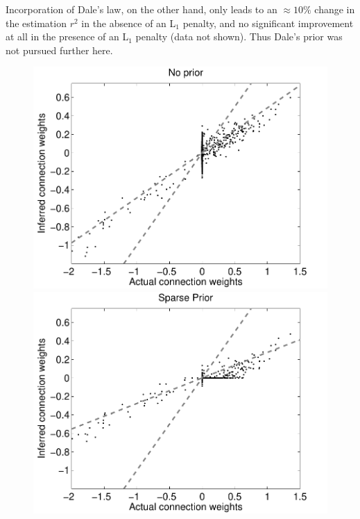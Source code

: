 \documentclass[aoas,preprint]{imsart}
\begin{document}
Incorporation of Dale's law, on the other hand, only leads to an
$\approx 10\%$ change in the estimation $r^2$ in the absence of an
L$_1$ penalty, and no significant improvement at all in the presence
of an L$_1$ penalty (data not shown).  Thus Dale's prior was not
pursued further here.

\begin{figure}[t!]
\centering
\begin{minipage}[c]{0.45\hsize}
\includegraphics[width=\hsize]{../figs/FigureA10_regular_sol}
\end{minipage}
\begin{minipage}[c]{0.45\hsize}
\includegraphics[width=\hsize]{../figs/FigureA10_sparse_sol}
\end{minipage}

\end{figure}
\end{document}
